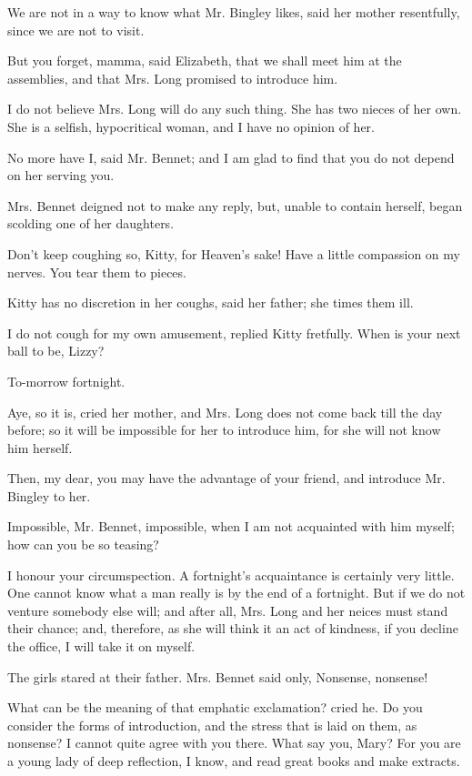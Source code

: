\documentclass{article}
\begin{document}
We are not in a way to know what Mr. Bingley likes, said her mother
resentfully, since we are not to visit.

But you forget, mamma, said Elizabeth, that we shall meet him at the
assemblies, and that Mrs. Long promised to introduce him.

I do not believe Mrs. Long will do any such thing. She has two nieces
of her own. She is a selfish, hypocritical woman, and I have no opinion
of her.

No more have I, said Mr. Bennet; and I am glad to find that you do
not depend on her serving you.

Mrs. Bennet deigned not to make any reply, but, unable to contain
herself, began scolding one of her daughters.

Don't keep coughing so, Kitty, for Heaven's sake! Have a little
compassion on my nerves. You tear them to pieces.

Kitty has no discretion in her coughs, said her father; she times
them ill.

I do not cough for my own amusement, replied Kitty fretfully. When is
your next ball to be, Lizzy?

To-morrow fortnight.

Aye, so it is, cried her mother, and Mrs. Long does not come back
till the day before; so it will be impossible for her to introduce him,
for she will not know him herself.

Then, my dear, you may have the advantage of your friend, and introduce
Mr. Bingley to her.

Impossible, Mr. Bennet, impossible, when I am not acquainted with him
myself; how can you be so teasing?

I honour your circumspection. A fortnight's acquaintance is certainly
very little. One cannot know what a man really is by the end of a
fortnight. But if we do not venture somebody else will; and after all,
Mrs. Long and her neices must stand their chance; and, therefore, as
she will think it an act of kindness, if you decline the office, I will
take it on myself.

The girls stared at their father. Mrs. Bennet said only, Nonsense,
nonsense!

What can be the meaning of that emphatic exclamation? cried he. Do
you consider the forms of introduction, and the stress that is laid on
them, as nonsense? I cannot quite agree with you there. What say you,
Mary? For you are a young lady of deep reflection, I know, and read
great books and make extracts.
\end{document}
